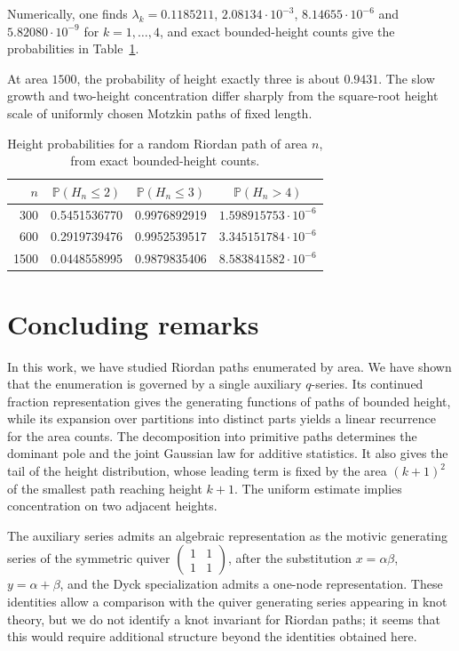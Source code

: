\documentclass[11pt,reqno]{amsart}
\numberwithin{equation}{section}
\theoremstyle{remark}
\begin{document}
Numerically, one finds $\lambda_k=0.1185211$, $2.08134\cdot10^{-3}$,
$8.14655\cdot10^{-6}$ and $5.82080\cdot10^{-9}$ for $k=1,\dots,4$, and exact
bounded-height counts give the probabilities in Table~\ref{tab:height}.

At area $1500$, the probability of height exactly three is about $0.9431$.
The slow growth and two-height concentration differ sharply from the square-root height
scale of uniformly chosen Motzkin paths of fixed length.

\begin{table}[tb]
\centering
\caption{Height probabilities for a random Riordan path of area $n$, from exact
bounded-height counts.}\label{tab:height}
\smallskip
\begin{tabular}{r@{\qquad}c@{\qquad}c@{\qquad}c}
\toprule
$n$ & $\mathbb P(H_n\le2)$ & $\mathbb P(H_n\le3)$ & $\mathbb P(H_n>4)$\\
\midrule
300 & 0.5451536770 & 0.9976892919 & $1.598915753\cdot10^{-6}$\\
600 & 0.2919739476 & 0.9952539517 & $3.345151784\cdot10^{-6}$\\
1500 & 0.0448558995 & 0.9879835406 & $8.583841582\cdot10^{-6}$\\
\bottomrule
\end{tabular}
\end{table}


\section{Concluding remarks}

In this work, we have studied Riordan paths enumerated by area. We have shown that the
enumeration is governed by a single auxiliary $q$-series. Its continued fraction
representation gives the generating functions of paths of bounded height, while its
expansion over partitions into distinct parts yields a linear recurrence for the area
counts. The decomposition into primitive paths determines the dominant pole and the
joint Gaussian law for additive statistics. It also gives the tail of the height distribution,
whose leading term is fixed by the area $(k+1)^2$ of the smallest path reaching height
$k+1$. The uniform estimate implies concentration on two adjacent heights.

The auxiliary series admits an algebraic representation as the motivic generating series
of the symmetric quiver $\left(\begin{smallmatrix}1&1\\1&1\end{smallmatrix}\right)$,
after the substitution $x=\alpha\beta$, $y=\alpha+\beta$, and the Dyck specialization
admits a one-node representation. These identities allow a comparison with the quiver
generating series appearing in knot theory, but we do not identify a knot invariant for
Riordan paths; it seems that this would require additional structure beyond the
identities obtained here.
\end{document}

